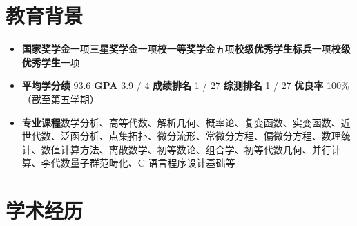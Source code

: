 \documentclass{resume}
\begin{document}




\sepspace
{}


\section{教育背景}
\begin{itemize}
  \item \textbf{国家奖学金}一项\quad\textbf{三星奖学金}一项\quad\textbf{校一等奖学金}五项\quad\textbf{校级优秀学生标兵}一项\quad\textbf{校级优秀学生}一项
  \item \textbf{平均学分绩} 93.6 \quad\textbf{GPA} 3.9 / 4 \quad\textbf{成绩排名} 1 / 27 \quad\textbf{综测排名} 1 / 27 \quad \textbf{优良率} 100\% \quad（截至第五学期）
  \item \textbf{专业课程}\quad 数学分析、高等代数、解析几何、概率论、复变函数、实变函数、近世代数、泛函分析、点集拓扑、微分流形、常微分方程、偏微分方程、数理统计、数值计算方法、离散数学、初等数论、组合学、初等代数几何、并行计算、李代数量子群范畴化、C 语言程序设计基础等
\end{itemize}

\section{学术经历}
\end{document}
